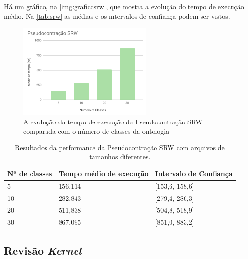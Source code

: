 Há um gráfico, na \autoref{img:graficosrw}, que mostra a evolução do tempo de execução médio. Na \autoref{tab:srw} as médias e os intervalos de confiança podem ser vistos.

\begin{figure}[H]
	\centering
	\includegraphics[width=0.6\textwidth]{Capitulos/Testes/graficosrw.png}
	\caption{A evolução do tempo de execução da Pseudocontração SRW comparada com o número de classes da ontologia.}
	\label{img:graficosrw}
\end{figure}

\begin{table}[H]
	\centering
	\begin{tabular}{|l|l|l|}
		\hline
		\textbf{Nº de classes} & \textbf{Tempo médio de execução} & \textbf{Intervalo de Confiança} \\ \hline
		5                                                 & 156,114                          & {[}153,6, 158,6{]}              \\ \hline
		10                                                & 282,843                          & {[}279,4, 286,3{]}              \\ \hline
		20                                                & 511,838                          & {[}504,8, 518,9{]}              \\ \hline
		30                                                & 867,095                          & {[}851,0, 883,2{]}              \\ \hline
	\end{tabular}
	\caption{Resultados da performance da Pseudocontração SRW com arquivos de tamanhos diferentes.}
	\label{tab:srw}
\end{table}

\subsection{Revisão \textit{Kernel}}


